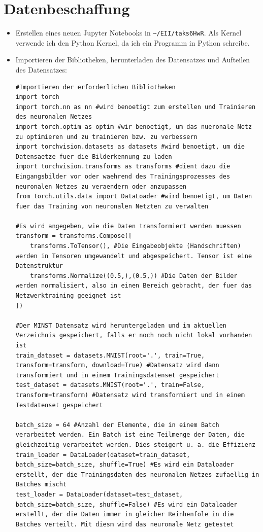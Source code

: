 \documentclass[a4paper,11pt,titlepage]{article}
\begin{document}
\section{Datenbeschaffung}
\begin{itemize}
\item Erstellen eines neuen Jupyter Notebooks in \verb+~/EII/taks6HwR+. Als Kernel verwende ich den Python Kernel, da ich ein Programm in Python schreibe.
\item Importieren der Bibliotheken, herunterladen des Datensatzes und Aufteilen des Datensatzes:\\
\begin{lstlisting}[style = python]
#Importieren der erforderlichen Bibliotheken
import torch 
import torch.nn as nn #wird benoetigt zum erstellen und Trainieren des neuronalen Netzes
import torch.optim as optim #wir benoetigt, um das nueronale Netz zu optimieren und zu trainieren bzw. zu verbessern
import torchvision.datasets as datasets #wird benoetigt, um die Datensaetze fuer die Bilderkennung zu laden
import torchvision.transforms as transforms #dient dazu die Eingangsbilder vor oder waehrend des Trainingsprozesses des neuronalen Netzes zu veraendern oder anzupassen
from torch.utils.data import DataLoader #wird benoetigt, um Daten fuer das Training von neuronalen Netzten zu verwalten

#Es wird angegeben, wie die Daten transformiert werden muessen
transform = transforms.Compose([
    transforms.ToTensor(), #Die Eingabeobjekte (Handschriften) werden in Tensoren umgewandelt und abgespeichert. Tensor ist eine Datenstruktur
    transforms.Normalize((0.5,),(0.5,)) #Die Daten der Bilder werden normalisiert, also in einen Bereich gebracht, der fuer das Netzwerktraining geeignet ist
])

#Der MINST Datensatz wird heruntergeladen und im aktuellen Verzeichnis gespeichert, falls er noch noch nicht lokal vorhanden ist
train_dataset = datasets.MNIST(root='.', train=True, transform=transform, download=True) #Datensatz wird dann transformiert und in einem Trainingsdatenset gespeichert
test_dataset = datasets.MNIST(root='.', train=False, transform=transform) #Datensatz wird transformiert und in einem Testdatenset gespeichert

batch_size = 64 #Anzahl der Elemente, die in einem Batch verarbeitet werden. Ein Batch ist eine Teilmenge der Daten, die gleichzeitig verarbeitet werden. Dies steigert u. a. die Effizienz 
train_loader = DataLoader(dataset=train_dataset, batch_size=batch_size, shuffle=True) #Es wird ein Dataloader erstellt, der die Trainingsdaten des neuronalen Netzes zufaellig in Batches mischt 
test_loader = DataLoader(dataset=test_dataset, batch_size=batch_size, shuffle=False) #Es wird ein Dataloader erstellt, der die Daten immer in gleicher Reinhenfole in die Batches verteilt. Mit diesm wird das neuronale Netz getestet
\end{lstlisting}
\end{itemize}
\end{document}
